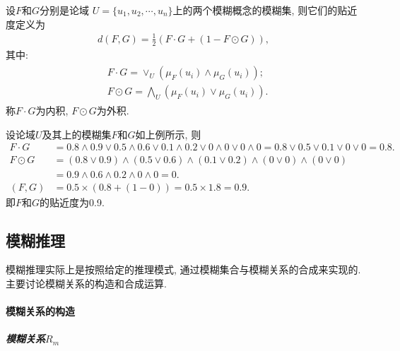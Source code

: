 设$F$和$G$分别是论域 $U=\{u_1, u_2, \cdots, u_n\}$上的两个模糊概念的模糊集, 则它们的贴近度定义为
\begin{align*}
    d(F, G)=\frac 1 2( F\cdot G+(1-F\odot G)),
\end{align*}
其中:
\begin{align*}
\begin{array}{ll}
    &F \cdot G=\vee_{U}\left(\mu_{F}\left(u_{i}\right) \wedge \mu_{G}\left(u_{i}\right)\right);\\
    &F \odot G=\bigwedge_{U}\left(\mu_{F}\left(u_{i}\right) \vee \mu_{G}\left(u_{i}\right)\right).
\end{array}
\end{align*}
称$F\cdot G$为内积, $F\odot G$为外积.
\begin{example}
设论域$U$及其上的模糊集$F$和$G$如上例所示, 则
\begin{align*}
F\cdot G&=0.8\wedge 0.9\vee 0.5\wedge 0.6\vee 0.1\wedge 0.2 \vee  0\wedge 0\vee  0\wedge 0=0.8\vee 0.5\vee 0.1 \vee  0 \vee  0=0.8.\\
F\odot G&= (0.8\vee 0.9)\wedge (0.5\vee 0.6)\wedge (0.1\vee 0.2) \wedge (0\vee 0) \wedge (0\vee 0)\\
        &=0.9\wedge 0.6\wedge 0.2\wedge 0\wedge 0 =0.\\
(F, G)&=0.5\times (0.8+(1-0))=0.5\times 1.8=0.9.
\end{align*}
即$F$和$G$的贴近度为0.9.
\end{example}

\subsection{模糊推理}
模糊推理实际上是按照给定的推理模式, 通过模糊集合与模糊关系的合成来实现的. 主要讨论模糊关系的构造和合成运算.

\paragraph{模糊关系的构造}
\subparagraph{\textbf{模糊关系$R_m$}}

